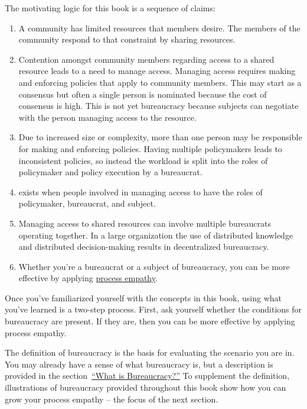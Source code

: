 The motivating logic for this book is a sequence of claims:
\begin{enumerate}
    \item A community has limited resources that members desire. The members of the community respond to that constraint by sharing resources.
    \item Contention amongst community members regarding access to a \gls{shared resource} leads to a need to manage access.  
    \iftoggle{glossaryinmargin}{\marginpar{[Glossary]}}{}%
    Managing access requires making and enforcing policies that apply to community members. This may start as a consensus but often a single person is nominated because the cost of consensus is high. This is not yet bureaucracy because subjects can negotiate with the person managing access to the resource.
    \item Due to increased size or complexity, more than one person may be responsible for making and enforcing policies. Having multiple policymakers leads to inconsistent policies, so instead the workload is split into the roles of policymaker and policy execution by a bureaucrat. 
    \item 
\iftoggle{glossarysubstitutionworks}{\Gls{bureaucracy}}{Bureaucracy}
exists when people involved in managing access to 
\iftoggle{glossarysubstitutionworks}{\glspl{shared resource}}{shared resources} have the roles of policymaker, bureaucrat, and subject.
    \item Managing access to shared resources can involve multiple bureaucrats operating together. In a large organization the use of distributed knowledge and distributed decision-making results in \gls{decentralized bureaucracy}.
    \item Whether you're a \gls{bureaucrat} 
    \iftoggle{glossaryinmargin}{\marginpar{[Glossary]}}{}%
    or a subject of bureaucracy, you can be more effective by applying \hyperref[sec:process-empathy]{process empathy}.
\end{enumerate}

Once you've familiarized yourself with the concepts in this book, using what you've learned is a two-step process. First, ask yourself whether the conditions for bureaucracy are present. If they are, then you can be more effective by applying process empathy.

The definition of bureaucracy is the basis for evaluating the scenario you are in. You may already have a sense of what bureaucracy is, but a description is provided
\iftoggle{haspagenumbers}{ on page~\pageref{sec:define-bureaucracy}}{} 
in the section~\hyperref[sec:define-bureaucracy]{``What is Bureaucracy?''} To supplement the definition, illustrations of bureaucracy provided throughout this book show how you can grow your process empathy -- the focus of the next section. 
